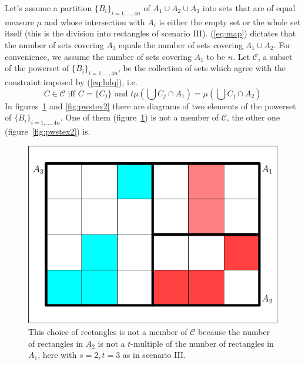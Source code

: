 \documentclass[12pt]{article}
\def\lwv{.6}
\begin{document}
Let's assume a partition $\{B_{i}\}_{i=1,{\ldots},4n}$ of
$A_{1}\cup{}A_{2}\cup{}A_{3}$ into sets that are of equal measure
$\mu$ and whose intersection with $A_{i}$ is either the empty set or
the whole set itself (this is the division into rectangles of scenario
III). ({\ref{eq:map}}) dictates that the number of sets covering $A_{3}$ equals
the number of sets covering $A_{1}\cup{}A_{2}$. For convenience, we
assume the number of sets covering $A_{1}$ to be $n$. Let
$\mathcal{C}$, a subset of the powerset of
$\{B_{i}\}_{i=1,{\ldots},4n}$, be the collection of sets which agree
with the constraint imposed by ({\ref{eq:hdq}}), i.e.\
\begin{displaymath}
  C\in\mathcal{C}\mbox{ iff }C=\{C_{j}\}\mbox{ and }t\mu\left(\bigcup{}C_{j}\cap{}A_{1}\right)=\mu\left(\bigcup{}C_{j}\cap{}A_{2}\right)
\end{displaymath}
In figures~\ref{fig:pwstex1} and \ref{fig:pwstex2} there are diagrams
of two elements of the powerset of $\{B_{i}\}_{i=1,{\ldots},4n}$. One
of them (figure~\ref{fig:pwstex1}) is not a member of $\mathcal{C}$,
the other one (figure~\ref{fig:pwstex2}) is. 

\begin{figure}[h]
  \begin{flushright}
    \begin{minipage}[h]{\lwv\linewidth}
      \includegraphics[width=\textwidth]{partition-2.pdf}
      \caption{This choice of rectangles is not a member of
        $\mathcal{C}$ because the number of rectangles in $A_{2}$ is
        not a $t$-multiple of the number of rectangles in $A_{1}$,
        here with $s=2,t=3$ as in scenario III.}
      \label{fig:pwstex1}
    \end{minipage}
  \end{flushright}
\end{figure}
\end{document}
